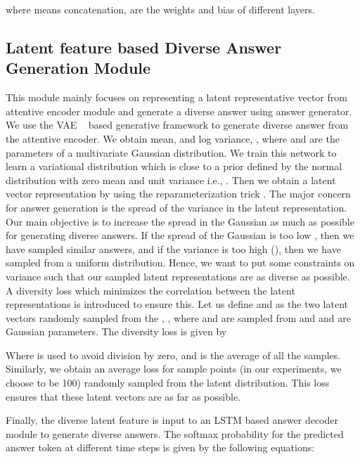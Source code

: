 \documentclass[review]{elsarticle}
\begin{document}
where  means concatenation,  are the weights and bias of different layers.

\subsection{Latent feature based Diverse Answer Generation Module}
This module mainly focuses on representing a latent representative vector from attentive encoder module and generate a diverse answer using answer generator. We use the VAE ~\cite{kingma_STAT2014} based generative framework to generate diverse answer from the attentive encoder. We obtain mean,  and log variance, , where  and  are the parameters of a multivariate Gaussian distribution. We train this network to learn a variational distribution which is close to a prior defined by the normal distribution with zero mean and unit variance i.e., . Then we obtain a latent vector representation  by using the reparameterization trick . The major concern for answer generation is the spread of the variance in the latent representation. Our main objective is to increase the spread in the Gaussian as much as possible for generating diverse answers.  If the spread of the Gaussian is too low , then we have sampled similar answers, and if the variance is too high (), then we have sampled from a uniform distribution. Hence, we want to put some constraints on variance such that our sampled latent representations are as diverse as possible. A diversity loss which minimizes the correlation between the latent representations is introduced to ensure this. Let us define  and  as the two latent vectors randomly sampled from the , , where  and  are sampled from  and  and  are Gaussian parameters. The  diversity loss is given by 

Where  is used to avoid division by zero, and  is the average of all the  samples. Similarly, we obtain an average loss for  sample points (in our experiments, we choose  to be 100) randomly sampled from the latent distribution. This loss ensures that these latent vectors are as far as possible.













Finally, the diverse latent feature is input to an LSTM based answer decoder module to generate diverse answers.
The softmax probability for the predicted answer token at different time steps is given by the following equations:
\end{document}
